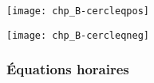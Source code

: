 \documentclass[../main/main.tex]{subfiles}
\begin{document}
\begin{minipage}{0.45\linewidth}
    \begin{center}
        \texttt{[image: chp\_B-cercleqpos]}
    \end{center}
\end{minipage}
\hfill
\begin{minipage}{0.45\linewidth}
    \begin{center}
        \texttt{[image: chp\_B-cercleqneg]}
    \end{center}
\end{minipage}

\subsubsection{Équations horaires}
\end{document}
